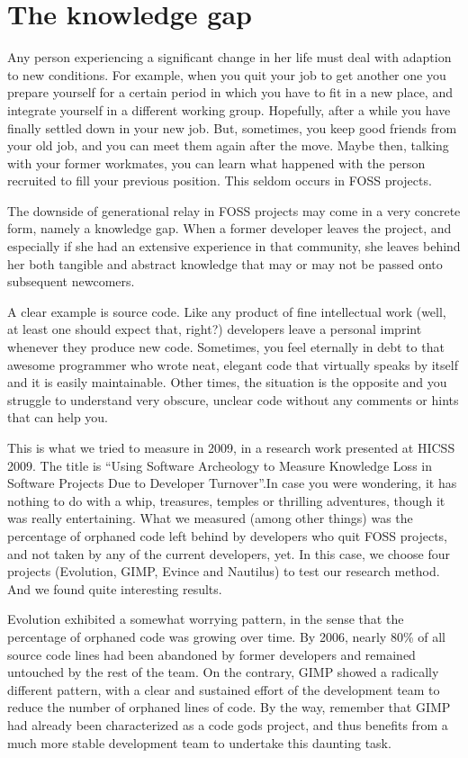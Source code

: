 \section*{The knowledge gap}

Any person experiencing a significant change in her life must deal with adaption
to new conditions. For example, when you quit your job to get another one you
prepare yourself for a certain period in which you have to fit in a new place,
and integrate yourself in a different working group. Hopefully, after a while
you have finally settled down in your new job. But, sometimes, you keep good
friends from your old job, and you can meet them again after the move. Maybe
then, talking with your former workmates, you can learn what happened with the
person recruited to fill your previous position. This seldom occurs in FOSS
projects.

The downside of generational relay in FOSS projects may come in a very concrete
form, namely a knowledge gap. When a former developer leaves the project, and
especially if she had an extensive experience in that community, she leaves
behind her both tangible and abstract knowledge that may or may not be passed
onto subsequent newcomers.

A clear example is source code. Like any product of fine intellectual work
(well, at least one should expect that, right?) developers leave a personal
imprint whenever they produce new code. Sometimes, you feel eternally in debt to
that awesome programmer who wrote neat, elegant code that virtually speaks by
itself and it is easily maintainable. Other times, the situation is the opposite
and you struggle to understand very obscure, unclear code without any comments
or hints that can help you.

This is what we tried to measure in 2009, in a research work presented at HICSS
2009. The title is ``Using Software Archeology to Measure Knowledge Loss in
Software Projects Due to Developer Turnover''.In case you were wondering, it has
nothing to do with a whip, treasures, temples or thrilling adventures, though it
was really entertaining. What we measured (among other things) was the
percentage of orphaned code left behind by developers who quit FOSS projects,
and not taken by any of the current developers, yet. In this case, we choose
four projects (Evolution, GIMP, Evince and Nautilus) to test our research
method. And we found quite interesting results.

Evolution exhibited a somewhat worrying pattern, in the sense that the
percentage of orphaned code was growing over time. By 2006, nearly 80\% of all
source code lines had been abandoned by former developers and remained untouched
by the rest of the team. On the contrary, GIMP showed a radically different
pattern, with a clear and sustained effort of the development team to reduce the
number of orphaned lines of code. By the way, remember that GIMP had already
been characterized  as a code gods project, and thus benefits from a much more
stable development team to undertake this daunting task.

